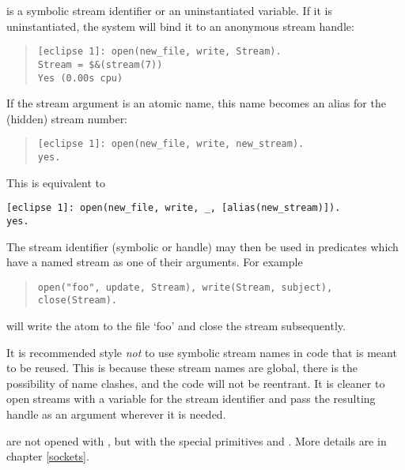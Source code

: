  is a symbolic stream identifier or an uninstantiated variable.
If it is uninstantiated, the system will bind it to an anonymous stream handle:
\begin{quote}
\begin{verbatim}
[eclipse 1]: open(new_file, write, Stream).
Stream = $&(stream(7))
Yes (0.00s cpu)
\end{verbatim}
\end{quote}
If the stream argument is an atomic name, this name becomes an alias
for the (hidden) stream number:
\begin{quote}
\begin{verbatim}
[eclipse 1]: open(new_file, write, new_stream).
yes.
\end{verbatim}
\end{quote}
This is equivalent to
\begin{verbatim}
[eclipse 1]: open(new_file, write, _, [alias(new_stream)]).
yes.
\end{verbatim}
The stream identifier (symbolic or handle) may then be used in predicates
which have a named stream as one of their arguments. For example
\begin{quote}
\begin{verbatim}
open("foo", update, Stream), write(Stream, subject), close(Stream).
\end{verbatim}
\end{quote}
will write the atom
 to the file `foo' and close the stream subsequently.


It is recommended style \emph{not} to use symbolic stream names in code that is
meant to be reused. This is because these stream names are global,
there is the possibility of name clashes, and the code will not be reentrant.
It is cleaner to open streams with a variable for the stream identifier
and pass the resulting handle as an argument wherever it is needed.

 are not opened with , but with the
special primitives
 and
.
More details are in chapter \ref{sockets}.


